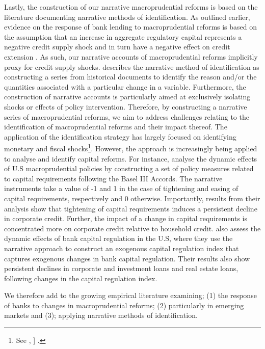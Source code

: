 \documentclass[
  letterpaper,
  DIV=11,
  numbers=noendperiod]{scrartcl}
\begin{document}
Lastly, the construction of our narrative macroprudential reforms is
based on the literature documenting narrative methods of identification.
As outlined earlier, evidence on the response of bank lending to
macroprudential reforms is based on the assumption that an increase in
aggregate regulatory capital represents a negative credit supply shock
and in turn have a negative effect on credit extension
\citep{noss2016estimating}. As such, our narrative accounts of
macroprudential reforms implicitly proxy for credit supply shocks.
\cite{ramey2016macroeconomic} describes the narrative method of
identification as constructing a series from historical documents to
identify the reason and/or the quantities associated with a particular
change in a variable. Furthermore, the construction of narrative
accounts is particularly aimed at exclusively isolating shocks or
effects of policy intervention\citep{angelopoulou2007narrative}.
Therefore, by constructing a narrative series of macroprudential
reforms, we aim to address challenges relating to the identification of
macroprudential reforms and their impact thereof. The application of the
identification strategy has largely focused on identifying monetary and
fiscal
shocks\footnote{See \cite{romer1989does}, \cite{romer1997identification} \cite{romer2004new} \cite{romer2010macroeconomic} \cite{ramey2011identifying} ]\cite{ramey2016macroeconomic} \cite{ramey2018government}.}.
However, the approach is increasingly being applied to analyse and
identify capital reforms. For instance, \cite{budnik2020identifying}
analyse the dynamic effects of U.S macroprudential policies by
constructing a set of policy measures related to capital requirements
following the Basel III Accords. The narrative instruments take a value
of -1 and 1 in the case of tightening and easing of capital
requirements, respectively and 0 otherwise. Importantly, results from
their analysis show that tightening of capital requirements induces a
persistent decline in corporate credit. Further, the impact of a change
in capital requirements is concentrated more on corporate credit
relative to household credit. \cite{eickmeier2018macroeconomic} also
assess the dynamic effects of bank capital regulation in the U.S, where
they use the narrative approach to construct an exogenous capital
regulation index that captures exogenous changes in bank capital
regulation. Their results also show persistent declines in corporate and
investment loans and real estate loans, following changes in the capital
regulation index.

We therefore add to the growing empirical literature examining; (1) the
response of banks to changes in macroprudential reforms; (2)
particularly in emerging markets and (3); applying narrative methods of
identification.
\end{document}

